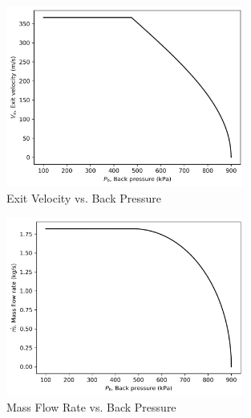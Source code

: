\begin{figure}[H]
    \centering
    \includegraphics[width=0.7\textwidth]{Questions/Figures/V_e_vs_P_b.png}
    \caption{Exit Velocity vs. Back Pressure}
    \label{fig:V_e_vs_P_b}
\end{figure}
\begin{figure}[H]
    \centering
    \includegraphics[width=0.7\textwidth]{Questions/Figures/m_vs_P_b.png}
    \caption{Mass Flow Rate vs. Back Pressure}
    \label{fig:m_vs_P_b}
\end{figure}
